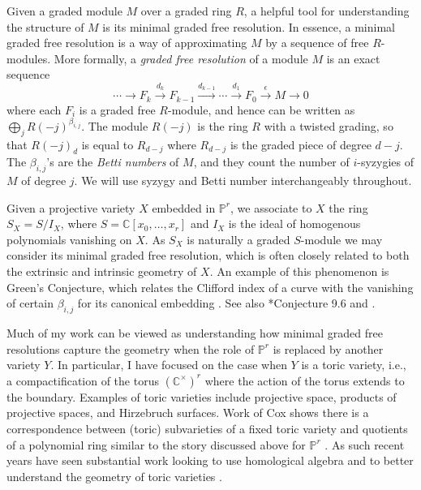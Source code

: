\documentclass[11pt,reqno]{amsart}
\theoremstyle{remark}
\newcommand{\C}{\mathbb{C}}
\renewcommand{\P}{\mathbb{P}}
\begin{document}
Given a graded module $M$ over a graded ring $R$, a helpful tool for understanding the structure of $M$ is its minimal graded free resolution. In essence, a minimal graded free resolution is a way of approximating $M$ by a sequence of free $R$-modules. More formally, a \textit{graded free resolution} of a module $M$ is an exact sequence 
\[
\cdots \xrightarrow{} F_{k} \xrightarrow{d_{k}} F_{k-1} \xrightarrow{d_{k-1}} \cdots \xrightarrow{d_{1}} F_{0}\xrightarrow{\epsilon}M\xrightarrow{} 0
\]
where each $F_{i}$ is a graded free $R$-module, and hence can be written as $\bigoplus_{j}R(-j)^{\beta_{i,j}}$. The module $R(-j)$ is the ring $R$ with a twisted grading, so that $R(-j)_{d}$ is equal to $R_{d-j}$ where $R_{d-j}$ is the graded piece of degree $d-j$. The $\beta_{i,j}$'s are the \textit{Betti numbers} of $M$, and they count the number of $i$-syzygies of $M$ of degree $j$. We will use syzygy and Betti number interchangeably throughout. 

Given a projective variety $X$ embedded in $\P^r$, we associate to $X$ the ring $S_X=S/I_X$, where $S=\C[x_0,\ldots,x_r]$ and $I_X$ is the ideal of homogenous polynomials vanishing on $X$. As $S_X$ is naturally a graded $S$-module we may consider its minimal graded free resolution, which is often closely related to both the extrinsic and intrinsic geometry of $X$.  An example of this phenomenon
 is Green's Conjecture, which relates the Clifford index of a curve with the vanishing of certain $\beta_{i,j}$ for its canonical embedding \cite{voisin02, voisin05, aproduFarkas19}. See also \cite{eisenbud05}*{Conjecture 9.6} and \cite{schreyer86, bayerEisenbud91,farkasPopa05, farkas06,aproduFarkas11,farkasKemeny16,farkasKemeny17}.
 
 Much of my work can be viewed as understanding how minimal graded free resolutions capture the geometry when the role of $\P^{r}$ is replaced by another variety $Y$. In particular, I have focused on the case when $Y$ is a toric variety, i.e., a compactification of the torus $(\C^{\times})^{r}$ where the action of the torus extends to the boundary. Examples of toric varieties include projective space, products of projective spaces, and Hirzebruch surfaces. Work of Cox shows there is a correspondence between (toric) subvarieties of a fixed toric variety and quotients of a polynomial ring similar to the story discussed above for $\P^{r}$ \cite{cox95}. As such recent years have seen substantial work looking to use homological algebra and to better understand the geometry of toric varieties \cite{almousaBruce19,berkeschErmanSmith17,brownErman22,brownErman23,BB21,cartwrightErmanVelscoViray09,EES15,GVT15,maclaganSmith04,maclaganSmith05}.
\end{document}
